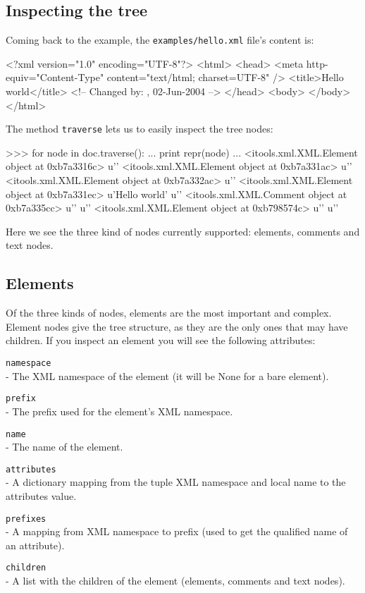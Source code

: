 \subsection{Inspecting the tree}

Coming back to the example, the {\tt examples/hello.xml} file's content is:

\begin{code}
    <?xml version="1.0" encoding="UTF-8"?>
    <html>
      <head>
        <meta http-equiv="Content-Type" content="text/html; charset=UTF-8" />
        <title>Hello world</title>
        <!-- Changed by: , 02-Jun-2004 -->
      </head>
      <body>
      </body>
    </html>
\end{code}

The method {\tt traverse} lets us to easily inspect the tree nodes:

\begin{code}
    >>> for node in doc.traverse():
    ...     print repr(node)
    ... 
    <itools.xml.XML.Element object at 0xb7a3316c>
    u'\n  '
    <itools.xml.XML.Element object at 0xb7a331ac>
    u'\n    '
    <itools.xml.XML.Element object at 0xb7a332ac>
    u'\n    '
    <itools.xml.XML.Element object at 0xb7a331ec>
    u'Hello world'
    u'\n    '
    <itools.xml.XML.Comment object at 0xb7a335cc>
    u'\n  '
    u'\n  '
    <itools.xml.XML.Element object at 0xb798574c>
    u'\n  '
    u'\n'
\end{code}

Here we see the three kind of nodes currently supported: elements, comments
and text nodes.

\subsection{Elements}

Of the three kinds of nodes, elements are the most important and complex.
Element nodes give the tree structure, as they are the only ones that may
have children. If you inspect an element you will see the following
attributes:

\begin{api}
    {\tt namespace}\\
    - The XML namespace of the element (it will be None for a bare element).

    {\tt prefix}\\
    - The prefix used for the element's XML namespace.

    {\tt name}\\
    - The name of the element.

    {\tt attributes}\\
    - A dictionary mapping from the tuple XML namespace and local name to
      the attributes value.

    {\tt prefixes}\\
    - A mapping from XML namespace to prefix (used to get the qualified
      name of an attribute).

    {\tt children}\\
    - A list with the children of the element (elements, comments and text
      nodes).
\end{api}


